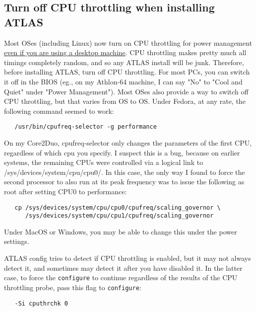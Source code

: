 \documentclass[11pt]{article}
\begin{document}
\subsection{Turn off CPU throttling when installing ATLAS}
Most OSes (including Linux) now turn on CPU throttling for power management\\
\underline{even if you are using a desktop machine}.  CPU throttling makes
pretty much all timings completely random, and so any ATLAS install will be
junk.  Therefore, before installing ATLAS, turn off CPU throttling.  For most
PCs, you can switch it off in the BIOS (eg., on my Athlon-64 machine, I can say
"No" to "Cool and Quiet" under "Power Management").  Most OSes also provide a
way to switch off CPU throttling, but that varies from OS to OS.  Under
Fedora, at any rate, the following command seemed to work:
\begin{verbatim}
   /usr/bin/cpufreq-selector -g performance 
\end{verbatim}

On my Core2Duo, cpufreq-selector only
changes the parameters of the first CPU, regardless of which cpu you specify.
I suspect this is a bug, because on earlier systems, the remaining CPUs were
controlled via a logical link to /sys/devices/system/cpu/cpu0/.  In this case,
the only way I found to force the second processor to also run at its peak
frequency was to issue the following as root after setting CPU0 to performance:
\begin{verbatim} 
   cp /sys/devices/system/cpu/cpu0/cpufreq/scaling_governor \
      /sys/devices/system/cpu/cpu1/cpufreq/scaling_governor 
\end{verbatim}
Under MacOS or Windows,
you may be able to change this under the power settings.

ATLAS config tries to detect if CPU throttling is enabled, but it may not
always detect it, and sometimes may detect it after you have disabled it.
In the latter case, to force the {\tt configure} to continue regardless of the
results of the CPU throttling probe, pass this flag to {\tt configure}:
\begin{verbatim}
   -Si cputhrchk 0
\end{verbatim}
\end{document}
